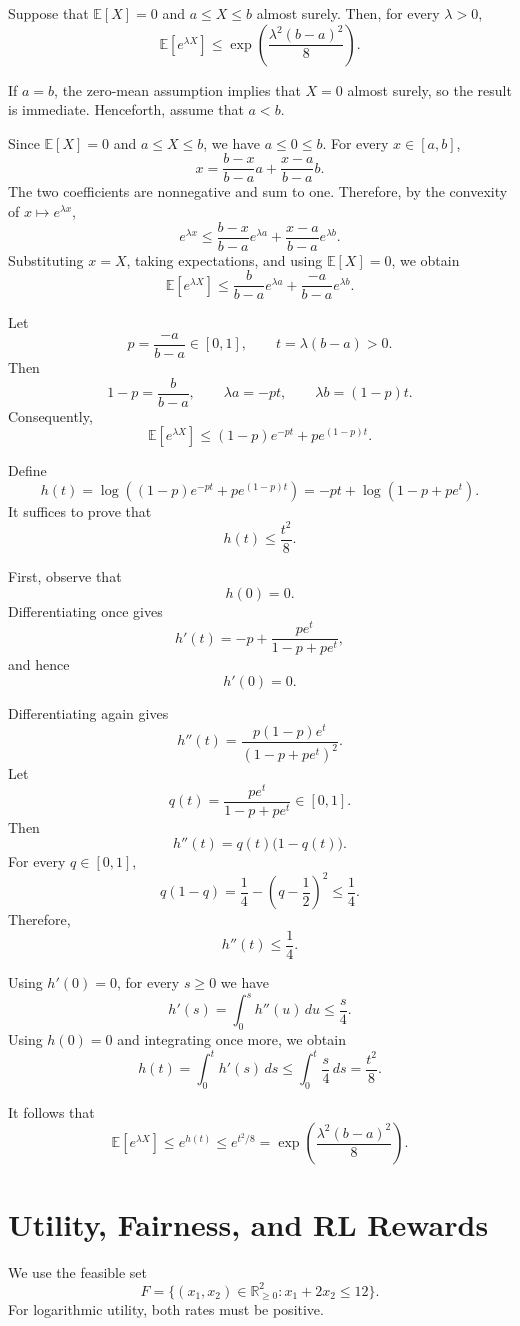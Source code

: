 \documentclass[11pt,a4paper]{article}
\begin{document}
Suppose that $\mathbb{E}[X]=0$ and $a\le X\le b$ almost surely.
Then, for every $\lambda>0$,
\[
\mathbb{E}[e^{\lambda X}]
\le \exp\!\left(\frac{\lambda^2(b-a)^2}{8}\right).
\]


If $a=b$, the zero-mean assumption implies that $X=0$ almost surely,
so the result is immediate. Henceforth, assume that $a<b$.

Since $\mathbb{E}[X]=0$ and $a\le X\le b$, we have $a\le 0\le b$.
For every $x\in[a,b]$,
\[
x=\frac{b-x}{b-a}a+\frac{x-a}{b-a}b.
\]
The two coefficients are nonnegative and sum to one. Therefore,
by the convexity of $x\mapsto e^{\lambda x}$,
\[
e^{\lambda x}
\le
\frac{b-x}{b-a}e^{\lambda a}
+\frac{x-a}{b-a}e^{\lambda b}.
\]
Substituting $x=X$, taking expectations, and using
$\mathbb{E}[X]=0$, we obtain
\[
\mathbb{E}[e^{\lambda X}]
\le
\frac{b}{b-a}e^{\lambda a}
+\frac{-a}{b-a}e^{\lambda b}.
\]

Let
\[
p=\frac{-a}{b-a}\in[0,1],
\qquad
t=\lambda(b-a)>0.
\]
Then
\[
1-p=\frac{b}{b-a},
\qquad
\lambda a=-pt,
\qquad
\lambda b=(1-p)t.
\]
Consequently,
\[
\mathbb{E}[e^{\lambda X}]
\le (1-p)e^{-pt}+pe^{(1-p)t}.
\]

Define
\[
h(t)
=\log\!\left((1-p)e^{-pt}+pe^{(1-p)t}\right)
=-pt+\log(1-p+pe^t).
\]
It suffices to prove that
\[
h(t)\le\frac{t^2}{8}.
\]

First, observe that
\[
h(0)=0.
\]
Differentiating once gives
\[
h'(t)=-p+\frac{pe^t}{1-p+pe^t},
\]
and hence
\[
h'(0)=0.
\]

Differentiating again gives
\[
h''(t)
=\frac{p(1-p)e^t}{(1-p+pe^t)^2}.
\]
Let
\[
q(t)=\frac{pe^t}{1-p+pe^t}\in[0,1].
\]
Then
\[
h''(t)=q(t)\bigl(1-q(t)\bigr).
\]
For every $q\in[0,1]$,
\[
q(1-q)
=\frac14-\left(q-\frac12\right)^2
\le\frac14.
\]
Therefore,
\[
h''(t)\le\frac14.
\]

Using $h'(0)=0$, for every $s\ge0$ we have
\[
h'(s)=\int_0^s h''(u)\,du
\le\frac{s}{4}.
\]
Using $h(0)=0$ and integrating once more, we obtain
\[
h(t)=\int_0^t h'(s)\,ds
\le\int_0^t\frac{s}{4}\,ds
=\frac{t^2}{8}.
\]

It follows that
\[
\mathbb{E}[e^{\lambda X}]
\le e^{h(t)}
\le e^{t^2/8}
=\exp\!\left(\frac{\lambda^2(b-a)^2}{8}\right).
\]
\section{Utility, Fairness, and RL Rewards}

We use the feasible set
\[
F=\{(x_1,x_2)\in\mathbb R_{\ge 0}^2:x_1+2x_2\le 12\}.
\]
For logarithmic utility, both rates must be positive.
\end{document}
